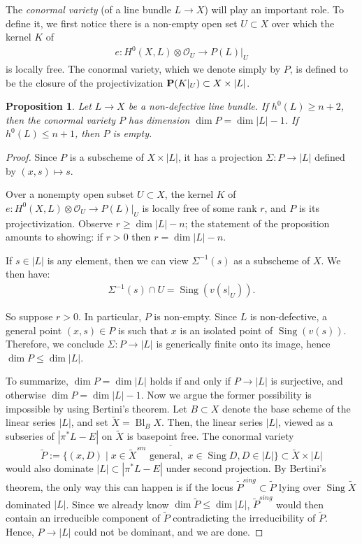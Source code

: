 \documentclass[11pt,reqno]{amsart}
\theoremstyle{plain}
\newtheorem{proposition}[theorem]{Proposition}
\theoremstyle{definition}
\theoremstyle{remark}
\numberwithin{equation}{section}
\DeclareMathOperator{\Bl}{Bl}
\DeclareMathOperator{\sing}{Sing}
\DeclareMathOperator{\dm}{dim}
\newcommand{\cO}{{\mathcal O}}
\renewcommand{\to}{{\longrightarrow}}
\numberwithin{equation}{section}
\begin{document}
The {\sl conormal variety} (of a line bundle $L \to X$) will play an important role.  To define it, we first notice there is a non-empty open set $U \subset X$ over which the kernel $K$ of
\begin{align*}
  e: H^{0}(X,L) \otimes \cO_{U} \to P(L)|_{U}
\end{align*}
is locally free. The conormal variety, which we denote simply by $P$, is defined
to be the closure of the projectivization $\P(K|_{U}) \subset X \times |L|$.


\begin{proposition}\label{prop:dimension}
  \label{prop:dimP}
  Let $L \to X$ be a non-defective line bundle.  If $h^{0}(L) \geq n+2$, then
  the conormal variety $P$ has dimension $\dm P = \dm |L| - 1$.  If $h^{0}(L) \leq n+1$, then $P$ is empty.
\end{proposition} 

\begin{proof}
  Since $P$ is a subscheme of $X \times |L|$, it has a projection $\Sigma: P \to |L|$ defined by $(x,s) \mapsto s$. 

  Over a nonempty open subset $U \subset X$, the kernel $K$ of $e: H^{0}(X,L) \otimes \cO_{U} \to P(L)|_{U}$ is locally free of some rank $r$, and $P$ is its projectivization. Observe $r \geq \dm |L| - n$; the statement of the proposition  amounts to showing: if $r>0$ then $r = \dm |L| - n$. 

    If $s \in |L|$ is any element, then we can view $\Sigma^{-1}(s)$ as a subscheme of $X$.  We then have: 
  \begin{align*}
    \Sigma^{-1}(s) \cap U = \sing(v(s|_{U})).
  \end{align*}

  So suppose $r>0$. In particular, $P$ is non-empty. Since $L$ is non-defective, a general point $(x,s) \in P$ is such that $x$ is an isolated point of $\sing(v(s))$.  Therefore, we conclude $\Sigma: P \to |L|$ is generically finite onto its image, hence $\dm P \leq \dm |L|$.  

  To summarize, $\dm P = \dm |L|$ holds if and only if $P \to |L|$ is surjective, and otherwise $\dm P = \dm |L| -1$.  Now we argue the former possibility is impossible by using Bertini's theorem.  Let $B \subset X$ denote the base scheme of the linear series $|L|$, and set $\widetilde{X} = \Bl_{B}X$. Then, the linear series $|L|$, viewed as a subseries of $|\pi^{*}L-E|$ on $\widetilde{X}$ is basepoint free.  The conormal variety $$\widetilde{P} := \overline{\{(x,D) \mid x \in \widetilde{X}^{sm} \,\, \text{general}, \,\, x \in \sing D, D \in|L|\}} \subset \widetilde{X} \times |L|$$ would also dominate $|L| \subset |\pi^{*}L-E|$ under second projection. By Bertini's theorem, the only way this can happen is if the locus $\widetilde{P}^{sing} \subset \widetilde{P}$ lying over $\sing \widetilde{X}$ dominated $|L|$.  Since we already know $\dm \widetilde{P} \leq \dm |L|$, $\widetilde{P}^{sing}$ would then contain an irreducible component of $\widetilde{P}$ contradicting the irreducibility of $\widetilde{P}$. Hence, $P \to |L|$ could not be dominant, and we are done.

\end{proof} 
\end{document}
